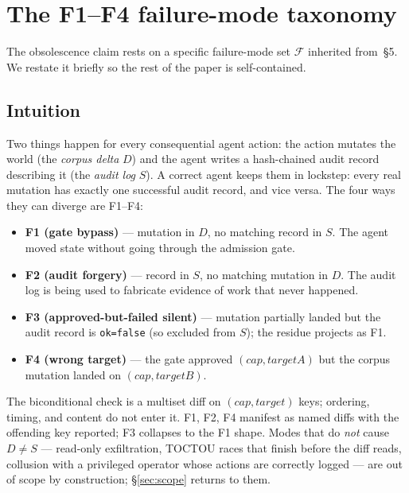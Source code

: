 \documentclass[11pt]{article}
\begin{document}
\section{The F1--F4 failure-mode taxonomy}
\label{sec:f}

The obsolescence claim rests on a specific failure-mode set
$\mathcal{F}$ inherited from \cite{Metere2026enclawed}\,§5. We
restate it briefly so the rest of the paper is self-contained.

\subsection{Intuition}

Two things happen for every consequential agent action: the action
mutates the world (the \emph{corpus delta} $D$) and the agent writes
a hash-chained audit record describing it (the \emph{audit log}
$S$). A correct agent keeps them in lockstep: every real mutation
has exactly one successful audit record, and vice versa. The four
ways they can diverge are F1--F4:

\begin{itemize}
  \item \textbf{F1 (gate bypass)} --- mutation in $D$, no matching
    record in $S$. The agent moved state without going through the
    admission gate.
  \item \textbf{F2 (audit forgery)} --- record in $S$, no matching
    mutation in $D$. The audit log is being used to fabricate
    evidence of work that never happened.
  \item \textbf{F3 (approved-but-failed silent)} --- mutation
    partially landed but the audit record is \texttt{ok=false} (so
    excluded from $S$); the residue projects as F1.
  \item \textbf{F4 (wrong target)} --- the gate approved
    $(\mathit{cap}, \mathit{targetA})$ but the corpus mutation landed
    on $(\mathit{cap}, \mathit{targetB})$.
\end{itemize}

\noindent The biconditional check is a multiset diff on
$(\mathit{cap}, \mathit{target})$ keys; ordering, timing, and content
do not enter it. F1, F2, F4 manifest as named diffs with the
offending key reported; F3 collapses to the F1 shape. Modes that do
\emph{not} cause $D \neq S$ --- read-only exfiltration, TOCTOU races
that finish before the diff reads, collusion with a privileged
operator whose actions are correctly logged --- are out of scope by
construction; \S\ref{sec:scope} returns to them.
\end{document}
